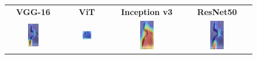 \documentclass[a4paper,12pt]{report}
\begin{document}
\begin{figure}[H]
    \centering
    \setlength{\tabcolsep}{1pt}
    \begin{tabular}{cccc}
    \textbf{VGG-16} & \textbf{ViT} & \textbf{Inception v3} & \textbf{ResNet50} \\
    
    \includegraphics[width=0.22\textwidth]{images/appendix/modelgraph/vgg/correct/Slaty_Backed_Gull/20241204_141506.jpg} &
    \includegraphics[width=0.22\textwidth]{images/appendix/modelgraph/vit/correct/Slaty_Backed_Gull/20241204_141506.jpg} &
    \includegraphics[width=0.22\textwidth]{images/appendix/modelgraph/inception/correct/Slaty_Backed_Gull/20241204_141506.jpg} &
    \includegraphics[width=0.22\textwidth]{images/appendix/modelgraph/resnet/correct/Slaty_Backed_Gull/20241204_141506.jpg} \\
    \end{tabular}

    \label{fig:interpretability_slaty_2}
\end{figure}
\end{document}

